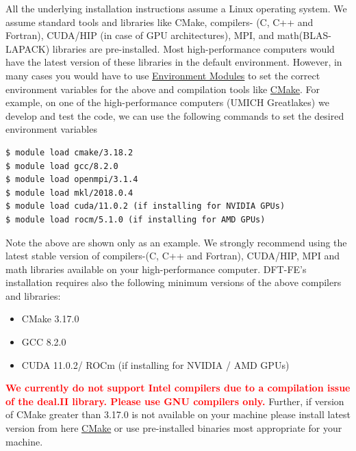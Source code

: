 All the underlying installation instructions assume a Linux operating system. We assume standard tools and libraries like CMake, compilers- (C, C++ and Fortran), CUDA/HIP (in case of GPU architectures), MPI, and math(BLAS-LAPACK) libraries are pre-installed. Most high-performance computers would have the latest version of these libraries in the default environment. However, in many cases you would have to use \href{http://modules.sourceforge.net/}{Environment Modules} to set the correct environment variables for the above and compilation tools like \href{http://www.cmake.org/}{CMake}. For example, on one of the high-performance computers (UMICH Greatlakes) we develop and test the \dftfe{} code, we can use the following commands to set the desired environment variables
\begin{verbatim}
$ module load cmake/3.18.2
$ module load gcc/8.2.0
$ module load openmpi/3.1.4
$ module load mkl/2018.0.4
$ module load cuda/11.0.2 (if installing for NVIDIA GPUs)
$ module load rocm/5.1.0 (if installing for AMD GPUs)
\end{verbatim}
Note the above are shown only as an example. We strongly recommend using the latest stable version of compilers-(C, C++ and Fortran), CUDA/HIP, MPI and math libraries available on your high-performance computer. DFT-FE's installation requires also the following minimum versions of the above compilers and libraries:
\begin{itemize}
    \item CMake 3.17.0
    \item GCC 8.2.0
    \item CUDA 11.0.2/ ROCm (if installing for NVIDIA / AMD GPUs)
\end{itemize}
\textcolor{red}{\bf We currently do not support Intel compilers due to a compilation issue of the deal.II library. Please use GNU compilers only.} Further, if version of CMake greater than 3.17.0 is not available on your machine please install latest version from here \href{http://www.cmake.org/}{CMake} or use pre-installed binaries most appropriate for your machine.

